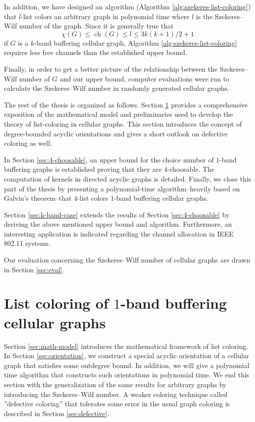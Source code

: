 \documentclass[a4paper, 12pt]{article}
\DeclareMathOperator*{\ch}{ch}
\begin{document}
In addition, we have designed an algorithm (Algorithm \ref{alg:szekeres-list-coloring}) that $l$-list colors an arbitrary graph in polynomial time where $l$ is the Szekeres\---Wilf number of the graph. Since it is generally true that 
$$\chi(G) \leqslant \ch(G) \leqslant l \leqslant 3k(k+1)/2+1$$
if $G$ is a $k$-band buffering cellular graph, Algorithm \ref{alg:szekeres-list-coloring} requires less free channels than the established upper bound.

Finally, in order to get a better picture of the relationship between the Szekeres\---Wilf number of $G$ and our upper bound, computer evaluations were run to calculate the Szekeres\---Wilf number in randomly generated cellular graphs.

The rest of the thesis is organized as follows. Section \ref{ch:list-coloring} provides a comprehensive exposition of the mathematical model and preliminaries used to develop the theory of list-coloring in cellular graphs. This section introduces the concept of degree-bounded acyclic orientations and gives a short outlook on defective coloring as well.

In Section \ref{sec:4-choosable}, an upper bound for the choice number of $1$-band buffering graphs is established proving that they are $4$-choosable. The computation of kernels in directed acyclic graphs is detailed. Finally, we close this part of the thesis by presenting a polynomial-time algorithm\---heavily based on Galvin's theorem\---that $4$-list colors $1$-band buffering cellular graphs.

Section \ref{sec:k-band-case} extends the results of Section \ref{sec:4-choosable} by deriving the above mentioned upper bound and algorithm. Furthermore, an interesting application is indicated regarding the channel allocation in IEEE 802.11 systems.

Our evaluation concerning the Szekeres\---Wilf number of cellular graphs are drawn in Section \ref{sec:eval}.

\newpage
\section{List coloring of $1$-band buffering cellular graphs} \label{ch:list-coloring}
Section \ref{sec:math-model} introduces the mathematical framework of list coloring. In Section \ref{sec:orientation}, we construct a special acyclic orientation of a cellular graph that satisfies some outdegree bound. In addition, we will give a polynomial time algorithm that constructs such orientations in polynomial time. We end this section with the generalization of the same results for arbitrary graphs by introducing the Szekeres\---Wilf number. A weaker coloring technique called ''defective coloring'' that tolerates some error in the usual graph coloring is described in Section \ref{sec:defective}.
\end{document}
